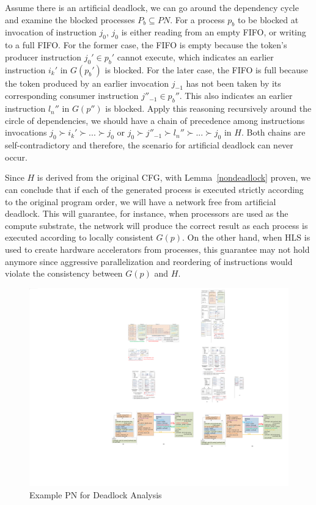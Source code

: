 \documentclass{sig-alternate}
\begin{document}
Assume there is an artificial deadlock, we can go around the dependency
cycle and examine the blocked processes $P_b \subseteq PN$. For a process $p_b$
to be blocked at invocation of instruction $j_0$, $j_0$ is either reading from an empty FIFO, or writing to a full FIFO. For the former case, the FIFO is empty because the token's producer instruction $j_0' \in p_b'$ cannot execute, which indicates an earlier instruction  $i_k'$ in $G(p_b')$ is blocked. For the later case, the FIFO is full because the token produced by an earlier invocation $j_{-1}$ has not been taken by its corresponding consumer instruction $j''_{-1} \in p_b''$. This also indicates an earlier instruction $l_n''$ in $G(p'')$ is blocked. Apply this reasoning recursively around the circle of dependencies,
we should have a chain of precedence among instructions invocations $j_0 \succ i_k' \succ ... \succ j_0$
or $j_0 \succ j''_{-1} \succ l_n'' \succ ... \succ j_0$ in $H$. %
Both chains are self-contradictory and therefore, the scenario for artificial deadlock can never occur. 

Since $H$ is derived from the original CFG, with Lemma~\ref{nondeadlock} proven, we can conclude that if each of the generated process is executed strictly according to the original program order, we will have a network free from artificial deadlock. This
will guarantee, for instance, when processors are used as the compute substrate, the network will produce the correct result as each process is executed according to locally consistent $G(p)$. On the other hand, when HLS is used to create hardware accelerators from processes, this guarantee may not
hold anymore since aggressive parallelization and reordering of instructions
would violate the consistency between $G(p)$ and $H$. 

\begin{figure}[htp]
\begin{center}
\includegraphics[width=1.0\linewidth]{fig/dlmo.pdf}
\caption{Example PN for Deadlock Analysis
\label{fig:example}}
\end{center}
\vspace{-2.0em}
\end{figure}
\end{document}
